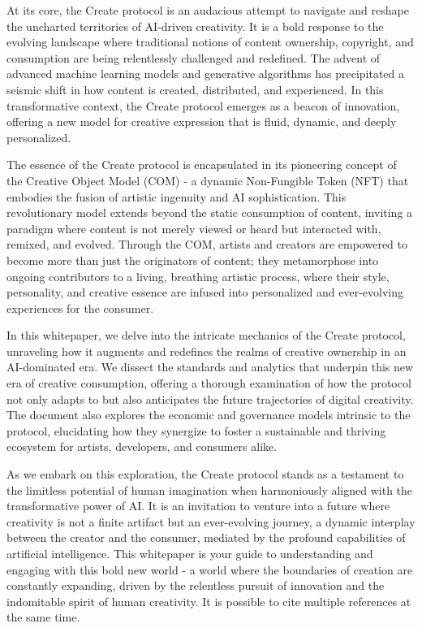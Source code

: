 \documentclass[12pt,a4paper]{article}
\begin{document}
At its core, the Create protocol is an audacious attempt to navigate and reshape the uncharted territories of AI-driven creativity. It is a bold response to the evolving landscape where traditional notions of content ownership, copyright, and consumption are being relentlessly challenged and redefined. The advent of advanced machine learning models and generative algorithms has precipitated a seismic shift in how content is created, distributed, and experienced. In this transformative context, the Create protocol emerges as a beacon of innovation, offering a new model for creative expression that is fluid, dynamic, and deeply personalized.

The essence of the Create protocol is encapsulated in its pioneering concept of the Creative Object Model (COM) - a dynamic Non-Fungible Token (NFT) that embodies the fusion of artistic ingenuity and AI sophistication. This revolutionary model extends beyond the static consumption of content, inviting a paradigm where content is not merely viewed or heard but interacted with, remixed, and evolved. Through the COM, artists and creators are empowered to become more than just the originators of content; they metamorphose into ongoing contributors to a living, breathing artistic process, where their style, personality, and creative essence are infused into personalized and ever-evolving experiences for the consumer.

In this whitepaper, we delve into the intricate mechanics of the Create protocol, unraveling how it augments and redefines the realms of creative ownership in an AI-dominated era. We dissect the standards and analytics that underpin this new era of creative consumption, offering a thorough examination of how the protocol not only adapts to but also anticipates the future trajectories of digital creativity. The document also explores the economic and governance models intrinsic to the protocol, elucidating how they synergize to foster a sustainable and thriving ecosystem for artists, developers, and consumers alike.

As we embark on this exploration, the Create protocol stands as a testament to the limitless potential of human imagination when harmoniously aligned with the transformative power of AI. It is an invitation to venture into a future where creativity is not a finite artifact but an ever-evolving journey, a dynamic interplay between the creator and the consumer, mediated by the profound capabilities of artificial intelligence. This whitepaper is your guide to understanding and engaging with this bold new world - a world where the boundaries of creation are constantly expanding, driven by the relentless pursuit of innovation and the indomitable spirit of human creativity.
It is possible to cite multiple references at the same time.
\end{document}
